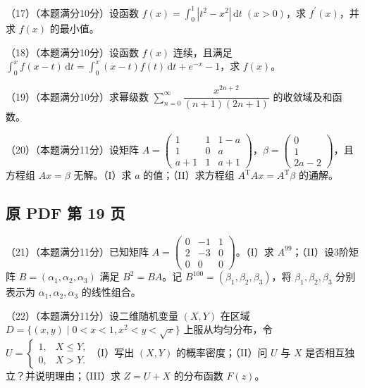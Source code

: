 \documentclass[UTF8,12pt]{ctexart}
\begin{document}
（17）（本题满分10分）设函数 \(\displaystyle f(x)=\displaystyle \int_0^1|t^2-x^2|\,\mathrm dt\;(x>0)\)，求 \(\displaystyle f^{\prime}(x)\)，并求 \(\displaystyle f(x)\) 的最小值。


（18）（本题满分10分）设函数 \(\displaystyle f(x)\) 连续，且满足 \(\displaystyle \int_0^xf(x-t)\,\mathrm dt=\displaystyle \int_0^x(x-t)f(t)\,\mathrm dt+e^{-x}-1\)，求 \(\displaystyle f(x)\)。


（19）（本题满分10分）求幂级数 \(\displaystyle \sum_{n=0}^{\infty}\dfrac{\displaystyle x^{2n+2}}{\displaystyle (n+1)(2n+1)}\) 的收敛域及和函数。


（20）（本题满分11分）设矩阵 \(\displaystyle A=\begin{pmatrix}1&1&1-a\\1&0&a\\a+1&1&a+1\end{pmatrix}\)，\(\displaystyle \beta=\begin{pmatrix}0\\1\\2a-2\end{pmatrix}\)，且方程组 \(\displaystyle Ax=\beta\) 无解。（I）求 \(\displaystyle a\) 的值；（II）求方程组 \(\displaystyle A^{\mathrm T}Ax=A^{\mathrm T}\beta\) 的通解。


\clearpage

\subsection*{原 PDF 第 19 页}

（21）（本题满分11分）已知矩阵 \(\displaystyle A=\begin{pmatrix}0&-1&1\\2&-3&0\\0&0&0\end{pmatrix}\)。（I）求 \(\displaystyle A^{99}\)；（II）设3阶矩阵 \(\displaystyle B=(\alpha_1,\allowbreak \alpha_2,\allowbreak \alpha_3)\) 满足 \(\displaystyle B^2=BA\)。记 \(\displaystyle B^{100}=(\beta_1,\allowbreak \beta_2,\allowbreak \beta_3)\)，将 \(\displaystyle \beta_1,\allowbreak \beta_2,\allowbreak \beta_3\) 分别表示为 \(\displaystyle \alpha_1,\allowbreak \alpha_2,\allowbreak \alpha_3\) 的线性组合。


（22）（本题满分11分）设二维随机变量 \(\displaystyle (X,\allowbreak Y)\) 在区域 \(\displaystyle D=\{(x,\allowbreak y)\mid0<x<1,\allowbreak x^2<y<\sqrt x\}\) 上服从均匀分布，令 \(\displaystyle U=\begin{cases}1,\allowbreak &X\le Y,\allowbreak \\0,\allowbreak &X>Y.\end{cases}\)（I）写出 \(\displaystyle (X,\allowbreak Y)\) 的概率密度；（II）问 \(\displaystyle U\) 与 \(\displaystyle X\) 是否相互独立？并说明理由；（III）求 \(\displaystyle Z=U+X\) 的分布函数 \(\displaystyle F(z)\)。
\end{document}
